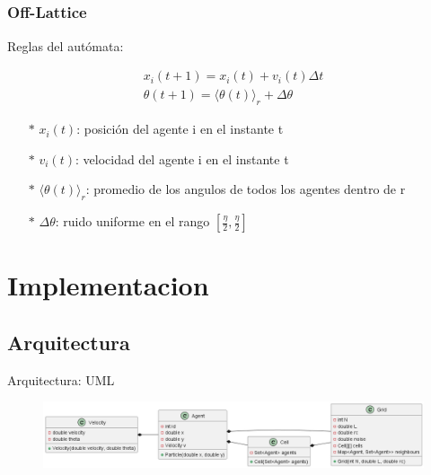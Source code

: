 \documentclass{beamer}
\begin{document}
\subsection{}
\begin{frame}
\frametitle{Off-Lattice}
Reglas del autómata:
\begin{center}
    \begin{align}
        x_i(t+1)=x_i(t)+v_i(t)\Delta t\\
        \theta(t+1)=\langle\theta(t)\rangle_r+\Delta\theta
    \end{align}
    \begin{itemize}
        \item[$\ast$] $x_i(t)$: posición del agente i en el instante t
        \item[$\ast$] $v_i(t)$: velocidad del agente i en el instante t
        \item[$\ast$] $\langle\theta(t)\rangle_r$: promedio de los angulos de todos los agentes dentro de r
        \item[$\ast$] $\Delta\theta$: ruido uniforme en el rango $[\frac{\eta}{2},\frac{\eta}{2}]$
    \end{itemize}
    \end{center}
\end{frame}

\section{Implementacion}

\subsection{Arquitectura}
\begin{frame}{Arquitectura: UML}
\begin{figure}[h]
    \centering
    \includegraphics[width=1\textwidth]{images/tp2models.png}
  \end{figure}

\end{frame}
\end{document}
